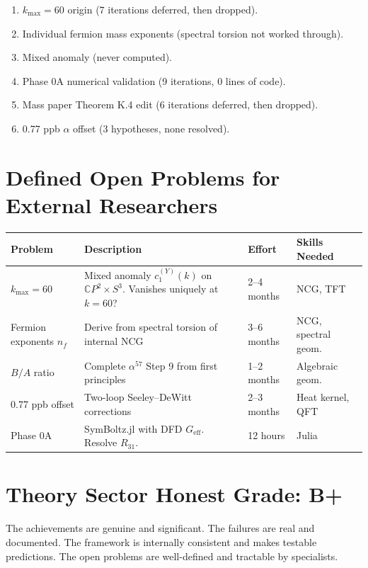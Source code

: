 \documentclass[11pt,a4paper]{article}
\newcommand{\CP}{\mathbb{C}P}
\begin{document}
\begin{enumerate}
\item $k_{\max} = 60$ origin (7 iterations deferred, then dropped).
\item Individual fermion mass exponents (spectral torsion not worked through).
\item Mixed anomaly (never computed).
\item Phase 0A numerical validation (9 iterations, 0 lines of code).
\item Mass paper Theorem K.4 edit (6 iterations deferred, then dropped).
\item 0.77 ppb $\alpha$ offset (3 hypotheses, none resolved).
\end{enumerate}

\section{Defined Open Problems for External Researchers}

\begin{center}
\begin{longtable}{p{3cm}p{6cm}p{2cm}p{2.5cm}}
\toprule
\textbf{Problem} & \textbf{Description} & \textbf{Effort} & \textbf{Skills Needed} \\
\midrule
$k_{\max} = 60$ & Mixed anomaly $c_1^{(Y)}(k)$ on $\CP^2 \times S^3$. Vanishes uniquely at $k = 60$? & 2--4 months & NCG, TFT \\
Fermion exponents $n_f$ & Derive from spectral torsion of internal NCG & 3--6 months & NCG, spectral geom. \\
$B/A$ ratio & Complete $\alpha^{57}$ Step 9 from first principles & 1--2 months & Algebraic geom. \\
0.77 ppb offset & Two-loop Seeley--DeWitt corrections & 2--3 months & Heat kernel, QFT \\
Phase 0A & SymBoltz.jl with DFD $G_\text{eff}$. Resolve $R_{31}$. & 12 hours & Julia \\
\bottomrule
\end{longtable}
\end{center}

\section{Theory Sector Honest Grade: B+}

The achievements are genuine and significant. The failures are real and documented. The framework is internally consistent and makes testable predictions. The open problems are well-defined and tractable by specialists.
\end{document}
